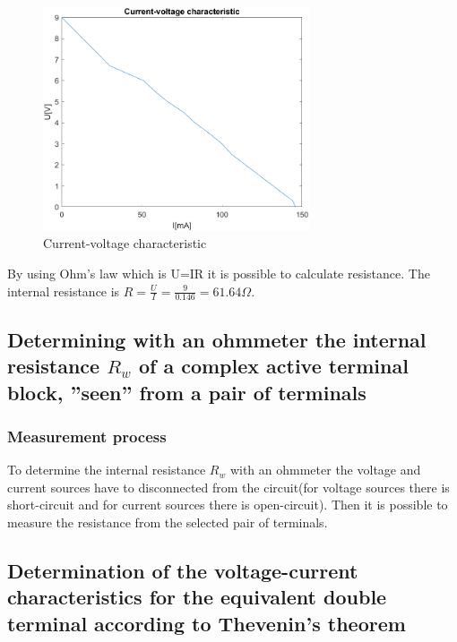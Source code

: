 \documentclass[]{scrartcl}
\begin{document}


\begin{figure}[H]
	\centering
	\includegraphics[width=0.7\textwidth]{Pictures/ct_cv_char_1.png}
	\caption{Current-voltage characteristic}
	\label{fig:current-voltage-char1}
\end{figure}

By using Ohm's law which is U=IR it is possible to calculate resistance. The internal resistance is $R=\frac{U}{I} = \frac{9}{0.146} = 61.64\Omega$.



\subsection{Determining with an ohmmeter the internal resistance $R_w$ of a complex active terminal block, ”seen” from a pair of terminals}

\subsubsection{Measurement process}

To determine the internal resistance $R_w$ with an ohmmeter the voltage and current sources have to disconnected from the circuit(for voltage sources there is short-circuit and for current sources there is open-circuit). Then it is possible to measure the resistance from the selected pair of terminals.



\subsection{Determination of the voltage-current characteristics for the equivalent double terminal according to Thevenin’s theorem}
\end{document}

